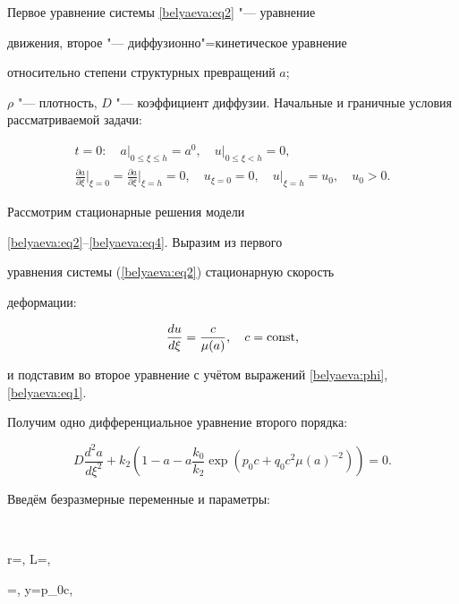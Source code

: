 Первое уравнение системы \eqref{belyaeva:eq2} "--- уравнение

движения, второе "--- диффузионно"=кинетическое уравнение

относительно степени структурных превращений $a$;

 $\rho $ "--- плотность, $D$ "--- коэффициент диффузии. Начальные и граничные условия рассматриваемой задачи:

\begin{gather}

\label{belyaeva:eq4}

 t=0: \quad  a\big|_{0\le \xi \le h} =a^0 ,\quad u\big|_{0\le \xi <h} =0,\\

\label{belyaeva:eq4} 

\frac{\partial a}{\partial \xi } \Big|_{\xi =0} = \frac{\partial a}{\partial \xi } \Bigg|_{\xi =h} =0,\quad

u_{\xi =0} =0, \quad  u\big|_{\xi =h} =u_0, \quad u_0>0.

\end{gather}



Рассмотрим стационарные решения модели

\eqref{belyaeva:eq2}--\eqref{belyaeva:eq4}. Выразим из первого

уравнения системы (\ref{belyaeva:eq2})  стационарную скорость

деформации:

$$

\frac{du}{d\xi } = \frac{c}{\mu (a)},\quad c={\rm const},

$$

и подставим во второе уравнение с учётом выражений \eqref{belyaeva:phi}, \eqref{belyaeva:eq1}. 

Получим одно дифференциальное уравнение второго порядка:

\begin{equation}

 \label{belyaeva:eq5}

D\frac{d ^2 a}{d \xi^2} +k_2 \left(1-a-a\frac{k_0}{k_2} \exp \left(p_0 c+q_0 c^2 \mu (a)^{-2} \right)\right)=0.

\end{equation}

Введём безразмерные переменные и параметры:

$$

r=, \quad L=, \quad

\chi=, \quad  y=p_0c, \quad \delta


